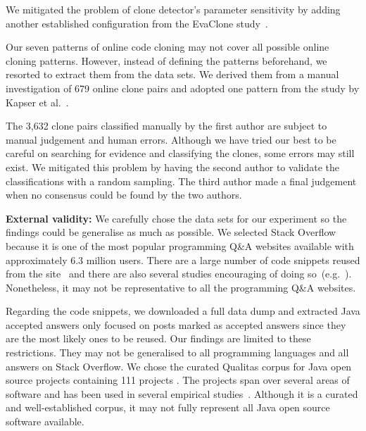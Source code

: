 \documentclass[sigconf,review, anonymous]{acmart}
\begin{document}
We mitigated the problem of clone
detector's parameter sensitivity by adding another established
configuration from the EvaClone study~\cite{Wang2013}. 


Our seven patterns of online code cloning may not cover all possible
online cloning patterns. However, instead of defining the patterns
beforehand, we resorted to extract them from the data sets. We derived
them from a manual investigation of 679 online clone pairs and adopted
one pattern from the study by Kapser et al.~\cite{Kapser2003}.

The 3,632 clone pairs classified manually by the first author are
subject to manual judgement and human errors.  Although we have tried
our best to be careful on searching for evidence and classifying the
clones, some errors may still exist. We mitigated this problem by
having the second author to validate the classifications with a random
sampling. 
The third author made a final judgement when no consensus
could be found by the two authors.

\textbf{External validity:} We carefully chose the data sets for our
experiment so the findings could be generalise as much as possible.
We selected Stack Overflow because it is one of the most popular
programming Q\&A websites available with approximately 6.3 million
users.  There are a large number of code snippets reused from the
site~\cite{An2017} and there are also several studies encouraging of
doing
so~(e.g.~\cite{Ponzanelli2013,Ponzanelli2014,Keivanloo2014,Park2014}).
Nonetheless, it may not be representative to all the programming Q\&A
websites.

Regarding the code snippets, we downloaded a full data dump and
extracted Java accepted answers
only focused on posts marked as accepted answers 
since they are the
most likely ones to be reused. 
Our findings are limited to these restrictions. They may
not be generalised to all programming languages and all answers on
Stack Overflow. We chose the curated Qualitas
corpus for Java open source projects containing 111 projects
\cite{QualitasCorpus}.  The projects span over several areas of
software and has been used in several empirical
studies~\cite{Taube-Schock2011,Beckman2011,Vasilescu2011,Omar2012}. Although
it is a curated and well-established corpus, it may not fully
represent all Java open source software available.
\end{document}
